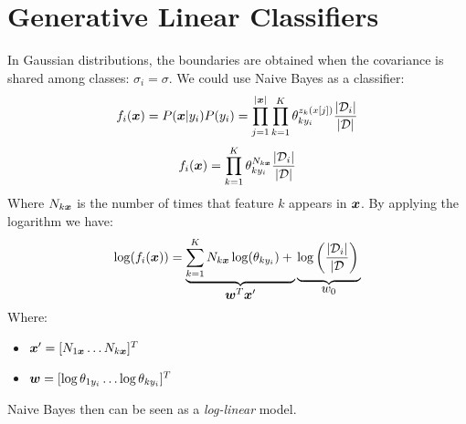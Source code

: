 \section{Generative Linear Classifiers}
In Gaussian distributions, the boundaries are obtained when the covariance is shared among classes: $\sigma_i=\sigma$. 
We could use Naive Bayes as a classifier:
\[f_i(\bm{x})=P(\bm{x}\vert y_i)P(y_i)=\displaystyle\prod_{j=1}^{\vert\bm{x}\vert}\displaystyle\prod_{k=1}^K\theta_{ky_i}^{z_k(x[j])}\frac{\vert\mathcal{D}_i\vert}{\vert\mathcal{D}\vert}\]
\[f_i(\bm{x})=\displaystyle\prod_{k=1}^K\theta_{ky_i}^{N_{k\bm{x}}}\frac{\vert\mathcal{D}_i\vert}{\vert\mathcal{D}\vert}\]
Where $N_{k\bm{x}}$ is the number of times that feature $k$ appears in $\bm{x}$. \newline
By applying the logarithm we have:
\[\log(f_i(\vect{x}))=
\underbrace{\Sum_{k=1}^KN_{k\vect{x}}\log(\theta_{ky_i})+                     \rule[-12pt]{0pt}{5pt}}_{\mbox{$\vect{w}^T\vect{x}'$}}
\underbrace{\log\left(\frac{\vert\mathcal{D}_i\vert}{\vert\mathcal{D}}\right) \rule[-12pt]{0pt}{5pt}}_{\mbox{$w_0$}}
\]
Where:
\begin{itemize}
  \item $\bm{x}'=[N_{1\bm{x}}\hdots N_{k\bm{x}}]^T$
  \item $\bm{w}=[\log\theta_{1y_i}\hdots\log\theta_{ky_i}]^T$
\end{itemize}
Naive Bayes then can be seen as a \textit{log-linear} model.










